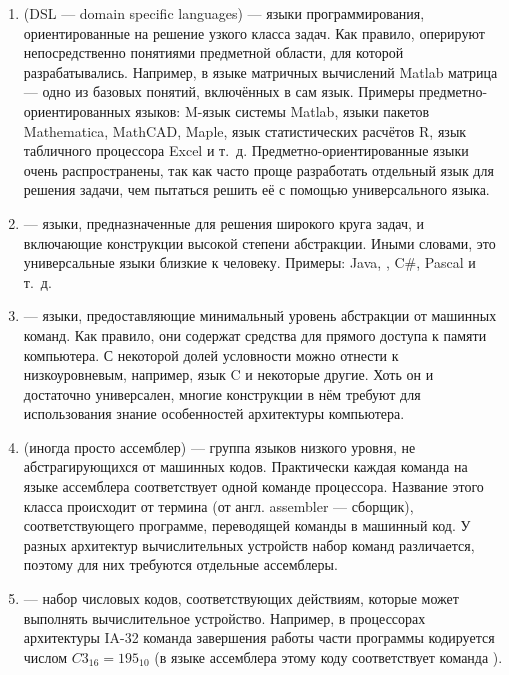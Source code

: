 \begin{enumerate}
\item {} (DSL — domain specific languages) — языки программирования,
  ориентированные на решение узкого класса задач. Как правило,
  оперируют непосредственно понятиями предметной области, для которой
  разрабатывались. Например, в языке матричных вычислений Matlab
  матрица — одно из базовых понятий, включённых в сам язык. Примеры
  предметно-ориентированных языков: M-язык системы Matlab, языки
  пакетов Mathematica, MathCAD, Maple, язык статистических расчётов R,
  язык табличного процессора Excel и т.~д. Предметно-ориентированные
  языки очень распространены, так как часто проще разработать
  отдельный язык для решения задачи, чем пытаться решить её с помощью
  универсального языка.
\item {} — языки,
  предназначенные для решения широкого круга задач, и включающие
  конструкции высокой степени абстракции.  Иными словами, это
  универсальные языки близкие к человеку. Примеры: Java, \CPP, C\#,
  Pascal и т.~д.
\item {} — языки,
  предоставляющие минимальный уровень абстракции от машинных
  команд. Как правило, они содержат средства для прямого доступа к
  памяти компьютера. С некоторой долей условности можно отнести к
  низкоуровневым, например, язык C и некоторые другие. Хоть он и
  достаточно универсален, многие конструкции в нём требуют для
  использования знание особенностей архитектуры компьютера.
\item {} (иногда просто
  ассемблер) — группа языков низкого уровня, не
  абстрагирующихся от машинных кодов. Практически каждая команда на
  языке ассемблера соответствует одной команде процессора.  Название
  этого класса происходит от термина  (от англ.
  assembler — сборщик), соответствующего программе, переводящей
  команды в машинный код. У разных архитектур вычислительных устройств
  набор команд различается, поэтому для них требуются отдельные
  ассемблеры.
\item {} — набор числовых кодов,
  соответствующих действиям, которые может выполнять вычислительное
  устройство. Например, в процессорах архитектуры IA-32 команда
  завершения работы части программы кодируется числом
  ${C3}_{16}={195}_{10}$ (в языке ассемблера этому коду соответствует
  команда ).
\end{enumerate}

